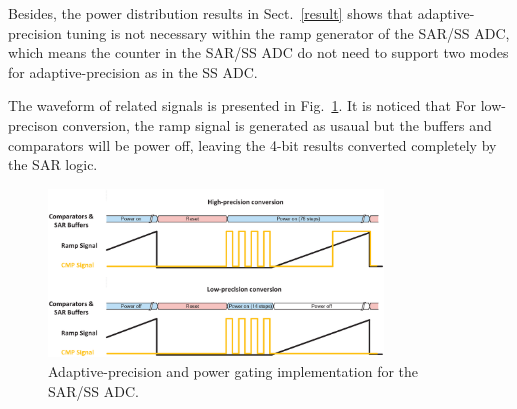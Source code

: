 Besides, the power distribution results in Sect.~\ref{result} shows that adaptive-precision tuning is not necessary within the ramp generator of the SAR/SS ADC, which means the counter in the SAR/SS ADC do not need to support two modes for adaptive-precision as in the SS ADC.

The waveform of related signals is presented in Fig.~\ref{SAR_pg}. It is noticed that For low-precison conversion, the ramp signal is generated as usaual but the buffers and comparators will be power off, leaving the 4-bit results converted completely by the SAR logic. 

\begin{figure}[htbp]
	\centerline{\includegraphics[width=3.5in]{./Figures/SAR_pg.eps}}
	\caption{Adaptive-precision and power gating implementation for the SAR/SS ADC.}
	\label{SAR_pg}
\end{figure} 
